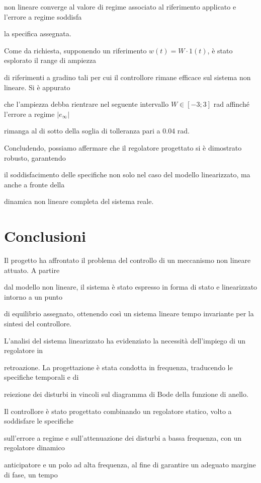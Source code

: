 \documentclass[a4paper, 11pt]{article}
\begin{document}
non lineare converge al valore di regime associato al riferimento applicato e l’errore a regime soddisfa 

la specifica assegnata.

Come da richiesta, supponendo un riferimento $w(t) = W \cdot1(t)$, è stato esplorato il range di ampiezza 

di
riferimenti a gradino tali per cui il controllore rimane efficace sul sistema non lineare. Si è appurato 

che l'ampiezza debba rientrare nel seguente intervallo $ W \in [ -3 ; 3]$ rad affinché l'errore a regime $|e_{\infty}|$ 

rimanga al di sotto della soglia di tolleranza pari a 0.04 rad.


Concludendo, possiamo affermare che il regolatore progettato si è dimostrato robusto, garantendo 

il soddisfacimento delle specifiche non solo nel caso del modello linearizzato, ma anche a fronte della 

dinamica non lineare completa del sistema reale.
\\

\section{Conclusioni}

Il progetto ha affrontato il problema del controllo di un meccanismo non lineare attuato. A partire 

dal modello non lineare, il sistema è stato espresso in forma di stato e linearizzato intorno a un punto 

di equilibrio assegnato, ottenendo così un sistema lineare tempo invariante per la sintesi del controllore.

L’analisi del sistema linearizzato ha evidenziato la necessità dell’impiego di un regolatore in 

retroazione. La progettazione è stata condotta in frequenza, traducendo le specifiche temporali e di 

reiezione dei disturbi in vincoli sul diagramma di Bode della funzione di anello.

Il controllore è stato progettato combinando un regolatore statico, volto a soddisfare le specifiche 

sull’errore a regime e sull’attenuazione dei disturbi a bassa frequenza, con un regolatore dinamico 

anticipatore e un polo ad alta frequenza, al fine di garantire un adeguato margine di fase, un tempo 
\end{document}
